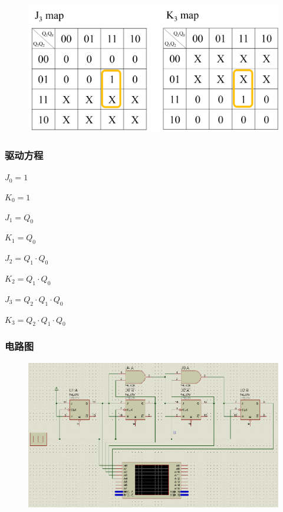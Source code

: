 \documentclass{article}
\begin{document}
\begin{figure}[!hbp]
  \centering
  \includegraphics[scale=0.5]{2/k4.png}
\end{figure}

\subsubsection{驱动方程}

$J_0 = 1$

$K_0 = 1$

$J_1 = Q_0$

$K_1 = Q_0$

$J_2 = Q_1 \cdot Q_0$

$K_2 = Q_1 \cdot Q_0$

$J_3 = Q_2 \cdot Q_1 \cdot Q_0$

$K_3 = Q_2 \cdot Q_1 \cdot Q_0$

\newpage

\subsubsection{电路图}

\begin{figure}[!hbp]
  \centering
  \includegraphics[scale=0.4]{2/1.png}
\end{figure}
\end{document}
